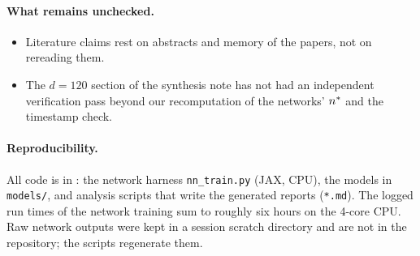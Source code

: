 \paragraph{What remains unchecked.}
\begin{itemize}
\item Literature claims rest on abstracts and memory of the papers, not on rereading them.
\item The $d=120$ section of the synthesis note has not had an independent verification pass beyond our recomputation of the networks' $n^{*}$ and the timestamp check.
\end{itemize}

\paragraph{Reproducibility.} All code is in : the network harness \texttt{nn\_train.py} (JAX, CPU), the models in \texttt{models/}, and analysis scripts that write the generated reports (\texttt{*.md}). The logged run times of the network training sum to roughly six hours on the 4-core CPU. Raw network outputs were kept in a session scratch directory and are not in the repository; the scripts regenerate them.
